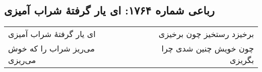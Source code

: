 \begin{center}
\section*{رباعی شماره ۱۷۶۴: ای یار گرفتهٔ شراب آمیزی}
\label{sec:1764}
\begin{longtable}{l p{0.5cm} r}
ای یار گرفتهٔ شراب آمیزی
&&
برخیزد رستخیز چون برخیزی
\\
می‌ریز شراب را که خوش می‌ریزی
&&
چون خویش چنین شدی چرا بگریزی
\\
\end{longtable}
\end{center}
